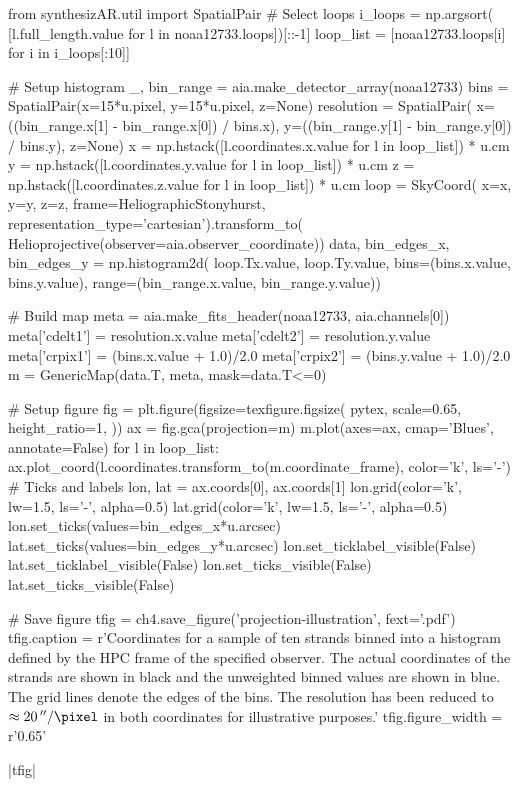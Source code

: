\begin{pycode}[chapter4]
from synthesizAR.util import SpatialPair
# Select loops
i_loops = np.argsort(
    [l.full_length.value for l in noaa12733.loops])[::-1]
loop_list = [noaa12733.loops[i] for i in i_loops[:10]]

# Setup histogram
_, bin_range = aia.make_detector_array(noaa12733)
bins = SpatialPair(x=15*u.pixel, y=15*u.pixel, z=None)
resolution = SpatialPair(
    x=((bin_range.x[1] - bin_range.x[0]) / bins.x),
    y=((bin_range.y[1] - bin_range.y[0]) / bins.y), z=None)
x = np.hstack([l.coordinates.x.value for l in loop_list]) * u.cm
y = np.hstack([l.coordinates.y.value for l in loop_list]) * u.cm
z = np.hstack([l.coordinates.z.value for l in loop_list]) * u.cm
loop = SkyCoord(
    x=x, y=y, z=z,
    frame=HeliographicStonyhurst,
    representation_type='cartesian').transform_to(
        Helioprojective(observer=aia.observer_coordinate))
data, bin_edges_x, bin_edges_y = np.histogram2d(
    loop.Tx.value, loop.Ty.value,
    bins=(bins.x.value, bins.y.value),
    range=(bin_range.x.value, bin_range.y.value))

# Build map
meta = aia.make_fits_header(noaa12733, aia.channels[0])
meta['cdelt1'] = resolution.x.value
meta['cdelt2'] = resolution.y.value
meta['crpix1'] = (bins.x.value + 1.0)/2.0
meta['crpix2'] = (bins.y.value + 1.0)/2.0
m = GenericMap(data.T, meta, mask=data.T<=0)

# Setup figure
fig = plt.figure(figsize=texfigure.figsize(
    pytex,
    scale=0.65,
    height_ratio=1,
))
ax = fig.gca(projection=m)
m.plot(axes=ax, cmap='Blues', annotate=False)
for l in loop_list:
    ax.plot_coord(l.coordinates.transform_to(m.coordinate_frame), color='k', ls='-')
# Ticks and labels
lon, lat = ax.coords[0], ax.coords[1]
lon.grid(color='k', lw=1.5, ls='-', alpha=0.5)
lat.grid(color='k', lw=1.5, ls='-', alpha=0.5)
lon.set_ticks(values=bin_edges_x*u.arcsec)
lat.set_ticks(values=bin_edges_y*u.arcsec)
lon.set_ticklabel_visible(False)
lat.set_ticklabel_visible(False)
lon.set_ticks_visible(False)
lat.set_ticks_visible(False)

# Save figure
tfig = ch4.save_figure('projection-illustration', fext='.pdf')
tfig.caption = r'Coordinates for a sample of ten strands binned into a histogram defined by the HPC frame of the specified observer. The actual coordinates of the strands are shown in black and the unweighted binned values are shown in blue. The grid lines denote the edges of the bins. The resolution has been reduced to $\approx\SI{20}{\arcsecond\per\pixel}$ in both coordinates for illustrative purposes.'
tfig.figure_width = r'0.65\textwidth'
\end{pycode}
\py[chapter4]|tfig|

